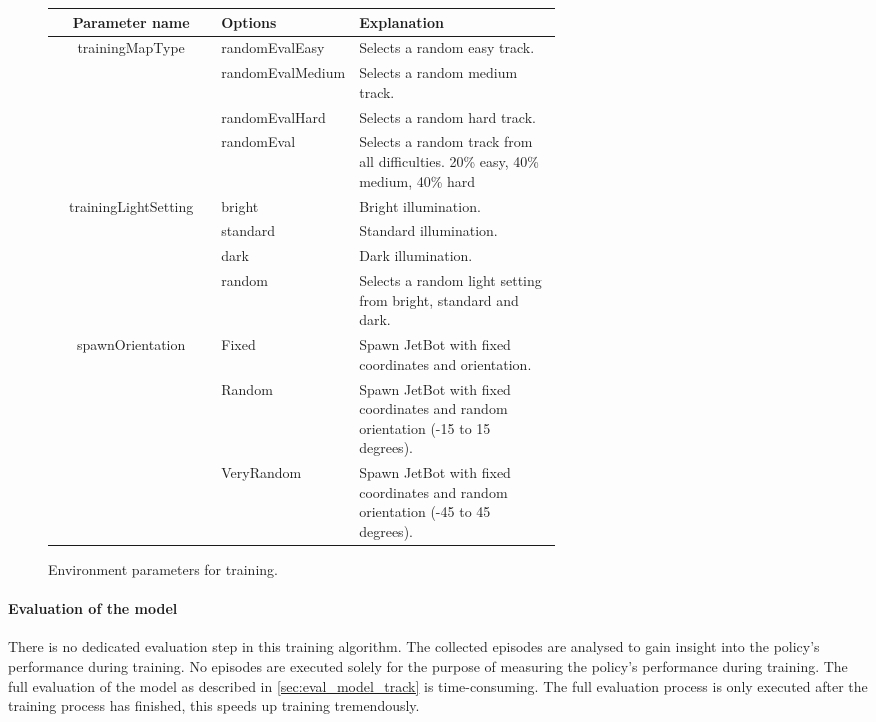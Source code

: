 \begin{figure}
    
    \begin{center}
    \begin{tabular}{|| c | p{0.25\linewidth} | p{0.4\linewidth} ||} 
        \hline
        Parameter name & Options & Explanation  \\ [0.5ex] 
        \hline\hline
        \multirow{4}{*}{trainingMapType} & randomEvalEasy & Selects a random easy track. \\\cline{2-3}
        & randomEvalMedium & Selects a random medium track. \\\cline{2-3}
        & randomEvalHard & Selects a random hard track. \\\cline{2-3}
        & randomEval & Selects a random track from all difficulties. 20\% easy, 40\% medium, 40\% hard \\
        \hline
        \multirow{4}{*}{trainingLightSetting} & bright & Bright illumination. \\\cline{2-3}
        & standard & Standard illumination. \\\cline{2-3}
        & dark & Dark illumination. \\\cline{2-3}
        & random & Selects a random light setting from bright, standard and dark. \\
        \hline
        \multirow{4}{*}{spawnOrientation} & Fixed & Spawn JetBot with fixed coordinates and orientation. \\\cline{2-3}
        & Random & Spawn JetBot with fixed coordinates and random orientation (-15 to 15 degrees). \\\cline{2-3}
        & VeryRandom & Spawn JetBot with fixed coordinates and random orientation (-45 to 45 degrees). \\
        \hline
    \end{tabular}
    \end{center}
    \caption{Environment parameters for training.} %
    \label{fig:env_reset_settings}
\end{figure}

\paragraph{Evaluation of the model}

There is no dedicated evaluation step in this training algorithm. The collected episodes are analysed to gain insight into the policy's performance during training. No episodes are executed solely for the purpose of measuring the policy's performance during training. The full evaluation of the model as described in \ref{sec:eval_model_track} is time-consuming. The full evaluation process is only executed after the training process has finished, this speeds up training tremendously.

